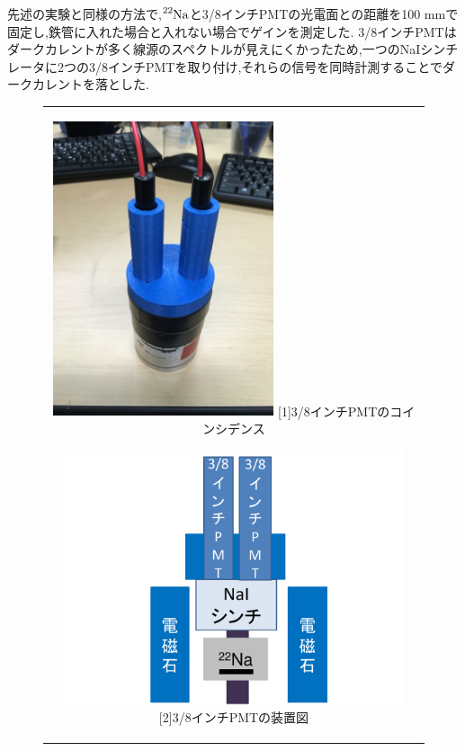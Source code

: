 先述の実験と同様の方法で,$\ce{^{22}Na}$と3/8インチPMTの光電面との距離を100 mmで固定し,鉄管に入れた場合と入れない場合でゲインを測定した.
3/8インチPMTはダークカレントが多く線源のスペクトルが見えにくかったため,一つのNaIシンチレータに2つの3/8インチPMTを取り付け,それらの信号を同時計測することでダークカレントを落とした.


\begin{figure}[h]
  \begin{center}
    \begin{tabular}{c}
      \begin{minipage}[h]{0.4\hsize}    
        \begin{center}
          \includegraphics[width=6.5cm]{fig/iguchi/PPMT.jpg}
	\hspace{3cm}[1]3/8インチPMTのコインシデンス
     \end{center}
    \end{minipage}
      \begin{minipage}[h]{0.6\hsize}    
        \begin{center}
          \includegraphics[width=10cm]{fig/iguchi/miniset.pdf}
         \hspace{3cm}[2]3/8インチPMTの装置図
         \end{center}
        \end{minipage}
     
     \end{tabular}
    \end{center}
   \end{figure}
   


